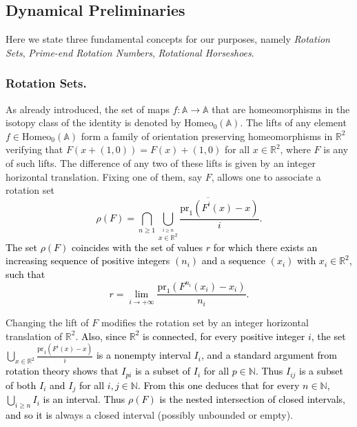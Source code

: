 \documentclass[12pt,a4paper]{amsart}
\theoremstyle{definition}
\theoremstyle{remark}
\newcommand{\R}{\mathbb{R}}
\newcommand{\N}{\mathbb{N}}
\newcommand{\homeo}{\mathrm{Homeo}_0(\A)}
\newcommand{\A}{\mathbb{A}}
\begin{document}


\subsection{Dynamical Preliminaries}\label{ss.dynamicalpreliminaries}
Here we state three fundamental concepts for our purposes, namely \emph{Rotation Sets},
\emph{Prime-end Rotation Numbers}, \emph{Rotational Horseshoes}.

\subsubsection{Rotation Sets.}

As already introduced, the set of maps $f:\A\to\A$ that are homeomorphisms in the isotopy class
of the identity is denoted by $\homeo$. The lifts of any element
$f\in\homeo$ form a family of orientation preserving homeomorphisms
in $\R^2$ verifying that $F(x+(1,0))=F(x)+(1,0)$ for all $x\in\R^2$, where $F$
is any of such lifts.
The difference of any two of these lifts is given by an integer horizontal
translation. Fixing one of them, say $F$, allows one to associate a rotation set \textcolor{black}{
$$\rho(F)=\bigcap_{n\ge 1}\overline{\bigcup_{\stackrel{i\ge n}{x\in\R^2}}\frac{\mathrm{pr}_1(F^{i}(x)-x)}{i}}.$$
The set $\rho(F)$ coincides with the set of values $r$ for which there exists an increasing sequence of positive integers $(n_i)$ and a sequence $(x_i)$ with $x_i \in \R^2$, such that 
$$r=\lim_{i\to+\infty} \frac{\mathrm{pr}_1(F^{n_i}(x_i)-x_i)}{n_i}.$$}

Changing the lift of $F$ modifies the rotation set by an integer horizontal translation of $\R^2$.
\textcolor{black}{Also, since $\R^2$ is connected, for every positive integer $i$, the set $\bigcup_{x\in\R^2}\frac{\mathrm{pr}_1(F^{i}(x)-x)}{i}$ is a nonempty interval $I_i$, and a standard argument from rotation theory shows that $I_{pi}$ is a subset of $I_i$ for all $p\in\N$. Thus $I_{ij}$ is a subset of both $I_i$ and $I_j$ for all $i,j\in\N$. From this one deduces that for every $n\in\N$, $\bigcup_{i\ge n}I_i$ is an interval. Thus $\rho(F)$ is the nested intersection of closed intervals, and so it is} always a closed interval (possibly unbounded or empty).
\end{document}
